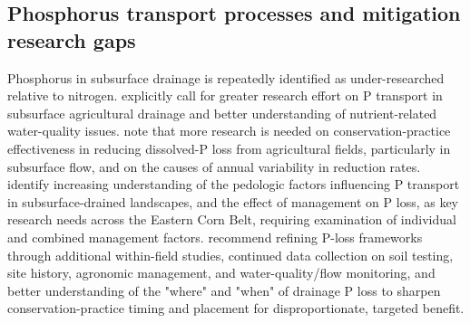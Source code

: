 \documentclass[11pt]{article}
\begin{document}
\subsection{Phosphorus transport processes and mitigation research gaps}

Phosphorus in subsurface drainage is repeatedly identified as under-researched relative to nitrogen. \textcite{Hertzberger2019} explicitly call for greater research effort on P transport in subsurface agricultural drainage and better understanding of nutrient-related water-quality issues. \textcite{Yuan2022} note that more research is needed on conservation-practice effectiveness in reducing dissolved-P loss from agricultural fields, particularly in subsurface flow, and on the causes of annual variability in reduction rates. \textcite{Pease2018} identify increasing understanding of the pedologic factors influencing P transport in subsurface-drained landscapes, and the effect of management on P loss, as key research needs across the Eastern Corn Belt, requiring examination of individual and combined management factors. \textcite{deOliveira2022} recommend refining P-loss frameworks through additional within-field studies, continued data collection on soil testing, site history, agronomic management, and water-quality/flow monitoring, and better understanding of the "where" and "when" of drainage P loss to sharpen conservation-practice timing and placement for disproportionate, targeted benefit.
\end{document}
